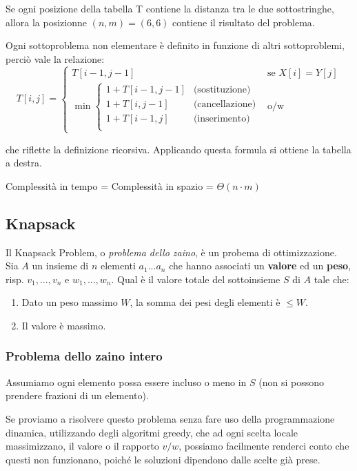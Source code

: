 \documentclass[a4paper,10pt]{article}
\theoremstyle{definition}
\begin{document}
Se ogni posizione della tabella T contiene la distanza tra le due sottostringhe, allora la posizionne $(n, m) = (6,6)$ contiene il risultato del problema.\smallskip

Ogni sottoproblema non elementare è definito in funzione di altri sottoproblemi, perciò vale la relazione:
\[T[i, j] = \begin{cases}
              T[i-1, j-1] & \text{se $X[i] = Y[j]$}\\
              \min \begin{cases}
                    1 + T[i-1, j-1] & \text{(sostituzione)}\\
                    1 + T[i, j-1] & \text{(cancellazione)}\\
                    1 + T[i-1, j] & \text{(inserimento)}\\
                   \end{cases} &\text{o/w}
             \end{cases}
\]

che riflette la definizione ricorsiva. Applicando questa formula si ottiene la tabella a destra.


Complessità in tempo = Complessità in spazio = $\Theta(n \cdot m)$


\subsection{Knapsack}
Il Knapsack Problem, o \emph{problema dello zaino}, è un probema di ottimizzazione. Sia $A$ un insieme di $n$ elementi $a_1 ... a_n$ che hanno associati un \textbf{valore} ed un \textbf{peso}, risp. $v_1, ..., v_n$ e $w_1, ..., w_n$. Qual è il valore totale del sottoinsieme $S$ di $A$ tale che:
\begin{enumerate}
 \item Dato un peso massimo $W$, la somma dei pesi degli elementi è $\leq W$.
 \item Il valore è massimo.
\end{enumerate}

\subsubsection{Problema dello zaino intero}
Assumiamo ogni elemento possa essere incluso o meno in $S$ (non si possono prendere frazioni di un elemento).

Se proviamo a risolvere questo problema senza fare uso della programmazione dinamica, utilizzando degli algoritmi greedy, che ad ogni scelta locale massimizzano, il valore o il rapporto $v/w$, possiamo facilmente renderci conto che questi non funzionano, poiché le soluzioni dipendono dalle scelte già prese. 
\end{document}
